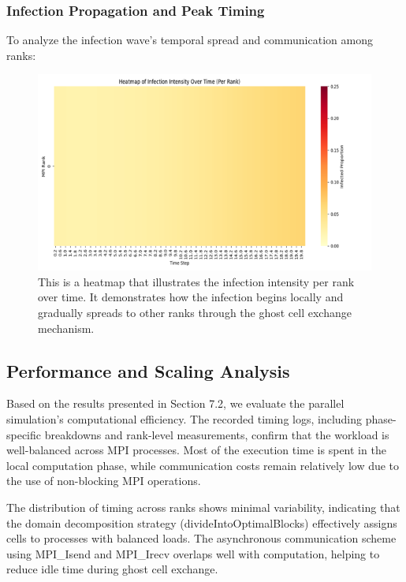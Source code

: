 \subsubsection{Infection Propagation and Peak Timing}
To analyze the infection wave’s temporal spread and communication among ranks:
\begin{figure}[H]
    \centering
    \includegraphics[width=14cm]{Images/pic8.png}
    \caption*{This is a heatmap that illustrates the infection intensity per rank over time. It demonstrates how the infection begins locally and gradually spreads to other ranks through the ghost cell exchange mechanism.}
    \label{fig:sir_line_plot}
\end{figure}

\subsection{Performance and Scaling Analysis}
Based on the results presented in Section 7.2, we evaluate the parallel simulation’s computational efficiency. The recorded timing logs, including phase-specific breakdowns and rank-level measurements, confirm that the workload is well-balanced across MPI processes. Most of the execution time is spent in the local computation phase, while communication costs remain relatively low due to the use of non-blocking MPI operations.


The distribution of timing across ranks shows minimal variability, indicating that the domain decomposition strategy (divideIntoOptimalBlocks) effectively assigns cells to processes with balanced loads. The asynchronous communication scheme using MPI\_Isend and MPI\_Irecv overlaps well with computation, helping to reduce idle time during ghost cell exchange.

